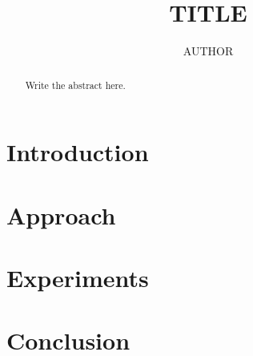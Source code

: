 \documentclass[11pt]{article}
\title{{{TITLE}}}
\author{{{AUTHOR}}}
\begin{document}
\maketitle

\begin{abstract}
Write the abstract here.
\end{abstract}

\section{Introduction}

\section{Approach}

\section{Experiments}

\section{Conclusion}


\end{document}
